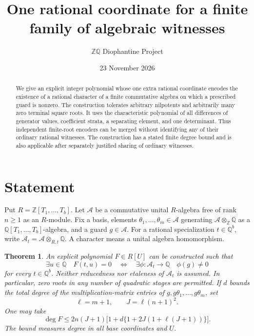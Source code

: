 \documentclass[11pt]{article}
\title{One rational coordinate for a finite family of algebraic witnesses}
\author{\(\mathbb Z\mathbb Q\) Diophantine Project}
\date{23 November 2026}
\newtheorem{theorem}{Theorem}
\newcommand{\Q}{\mathbb Q}\newcommand{\Z}{\mathbb Z}
\newcommand{\A}{\mathcal A}
\begin{document}
\maketitle
\begin{abstract}
We give an explicit integer polynomial whose one extra rational coordinate
encodes the existence of a rational character of a finite commutative
algebra on which a prescribed guard is nonzero. The construction tolerates
arbitrary nilpotents and arbitrarily many zero terminal square roots.
It uses the characteristic polynomial of all differences of generator
values, coefficient strata, a separating element, and one determinant.
Thus independent finite-root encoders can be merged without identifying
any of their ordinary rational witnesses. The construction has a stated
finite degree bound and is also applicable after separately justified
sharing of ordinary witnesses.
\end{abstract}

\section{Statement}
Put $R=\Z[T_1,\ldots,T_b]$. Let $\A$ be a commutative unital $R$-algebra
free of rank $n\ge1$ as an $R$-module. Fix a basis, elements
$\theta_1,\ldots,\theta_m\in\A$ generating
$\A\otimes_{\mathbb Z}\mathbb Q$ as a $\mathbb Q[T_1,\ldots,T_b]$-algebra, and a guard
$g\in\A$. For a rational specialization $t\in\Q^b$, write
$\A_t=\A\otimes_{R,t}\Q$. A character means a unital algebra homomorphism.

\begin{theorem}\label{main}
An explicit polynomial $F\in R[U]$ can be constructed such that
\begin{equation}\label{equivalence}
 \exists u\in\Q\quad F(t,u)=0
 \quad\Longleftrightarrow\quad
 \exists\phi:\A_t\longrightarrow\Q\quad\phi(g)\ne0
\end{equation}
for every $t\in\Q^b$. Neither reducedness nor etaleness of $\A_t$ is
assumed. In particular, zero roots in any number of quadratic stages are
permitted. If $d$ bounds the total degree of the multiplication-matrix
entries of $g,g\theta_1,\ldots,g\theta_m$, set
\[
 \ell=m+1,\qquad J=\ell(n+1)^2.
\]
One may take
\begin{equation}\label{degree}
 \deg F\le
 2n(J+1)\bigl[1+d\{1+2J(1+\ell(J+1))\}\bigr].
\end{equation}
The bound measures degree in all base coordinates and $U$.
\end{theorem}
\end{document}
